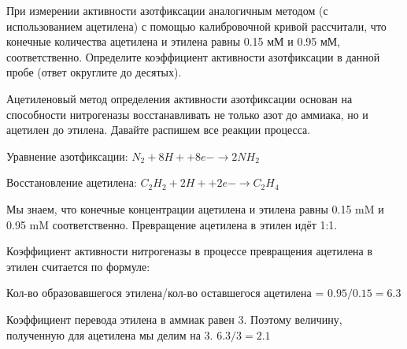 
При измерении активности азотфиксации аналогичным методом (с использованием ацетилена) с помощью калибровочной кривой рассчитали, что конечные количества ацетилена и этилена равны 0.15 мМ и 0.95 мМ, соответственно. Определите коэффициент активности азотфиксации в данной пробе (ответ округлите до десятых).

\solutionSection

Ацетиленовый метод определения активности азотфиксации основан на способности нитрогеназы восстанавливать не только азот до аммиака, но и ацетилен до этилена. Давайте распишем все реакции процесса. 

Уравнение азотфиксации: $N_2 + 8H+ + 8e - \rightarrow 2NH_2 $

Восстановление ацетилена: $C_2H_2 + 2H+ + 2e - \rightarrow C_2H_4$

Мы знаем, что конечные концентрации ацетилена и этилена равны 0.15 mM и 0.95 mM соответственно. Превращение ацетилена в этилен идёт 1:1. 

Коэффициент активности нитрогеназы в процессе превращения ацетилена в этилен считается по формуле: 

Кол-во образовавшегося этилена/кол-во оставшегося ацетилена = $0.95/0.15=6.3$

Коэффициент перевода этилена в аммиак равен 3. Поэтому величину, полученную для ацетилена мы делим на 3. 
$6.3/3=2.1$ 

